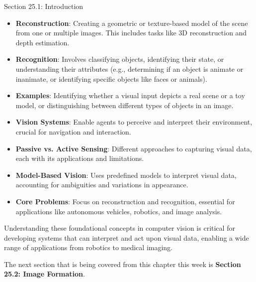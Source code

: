 \begin{notes}{Section 25.1: Introduction}
\begin{highlight}
        \begin{itemize}
            \item \textbf{Reconstruction}: Creating a geometric or texture-based model of the scene from one or multiple images. This includes tasks like 3D reconstruction and depth estimation.
            \item \textbf{Recognition}: Involves classifying objects, identifying their state, or understanding their attributes (e.g., determining if an object is animate or inanimate, or identifying specific 
            objects like faces or animals).
            \item \textbf{Examples}: Identifying whether a visual input depicts a real scene or a toy model, or distinguishing between different types of objects in an image.
        \end{itemize}
    
    \end{highlight}
    
    \begin{highlight}
    
        \begin{itemize}
            \item \textbf{Vision Systems}: Enable agents to perceive and interpret their environment, crucial for navigation and interaction.
            \item \textbf{Passive vs. Active Sensing}: Different approaches to capturing visual data, each with its applications and limitations.
            \item \textbf{Model-Based Vision}: Uses predefined models to interpret visual data, accounting for ambiguities and variations in appearance.
            \item \textbf{Core Problems}: Focus on reconstruction and recognition, essential for applications like autonomous vehicles, robotics, and image analysis.
        \end{itemize}
    
        Understanding these foundational concepts in computer vision is critical for developing systems that can interpret and act upon visual data, enabling a wide range of applications from robotics to 
        medical imaging.
    
    \end{highlight}
\end{notes}

The next section that is being covered from this chapter this week is \textbf{Section 25.2: Image Formation}.

